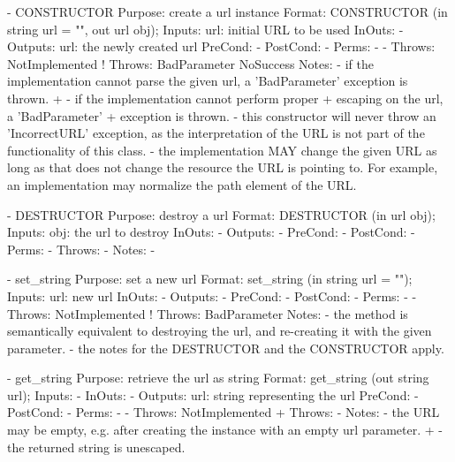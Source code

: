  \begin{myspec}
    - CONSTRUCTOR
      Purpose:  create a url instance
      Format:   CONSTRUCTOR          (in  string url = "",
                                      out url    obj);
      Inputs:   url:                  initial URL to be used
      InOuts:   -
      Outputs:  url:                  the newly created url
      PreCond:  -
      PostCond: -
      Perms:    -
-     Throws:   NotImplemented
!     Throws:   BadParameter
                NoSuccess
      Notes:    - if the implementation cannot parse the given
                  url, a 'BadParameter' exception is thrown.
+               - if the implementation cannot perform proper
+                 escaping on the url, a 'BadParameter' 
+                 exception is thrown.
                - this constructor will never throw an
                  'IncorrectURL' exception, as the
                  interpretation of the URL is not part of the
                  functionality of this class.
                - the implementation MAY change the given
                  URL as long as that does not change the
                  resource the URL is pointing to.  For
                  example, an implementation may normalize the
                  path element of the URL.
 
 
    - DESTRUCTOR
      Purpose:  destroy a url
      Format:   DESTRUCTOR           (in  url obj);
      Inputs:   obj:                  the url to destroy
      InOuts:   -
      Outputs:  -
      PreCond:  -
      PostCond: -
      Perms:    -
      Throws:   -
      Notes:    -
 
 
    - set_string
      Purpose:  set a new url
      Format:   set_string           (in  string url = "");
      Inputs:   url:                  new url
      InOuts:   -
      Outputs:  -
      PreCond:  -
      PostCond: -
      Perms:    -
-     Throws:   NotImplemented
!     Throws:   BadParameter
      Notes:    - the method is semantically equivalent to
                  destroying the url, and re-creating it with
                  the given parameter.
                - the notes for the DESTRUCTOR and the 
                  CONSTRUCTOR apply.
 
 
    - get_string
      Purpose:  retrieve the url as string
      Format:   get_string           (out string url);
      Inputs:   -
      InOuts:   -
      Outputs:  url:                  string representing the url
      PreCond:  -
      PostCond: -
      Perms:    -
-     Throws:   NotImplemented
+     Throws:   -
      Notes:    - the URL may be empty, e.g. after creating the
                  instance with an empty url parameter.
+               - the returned string is unescaped.
 

\end{myspec}

